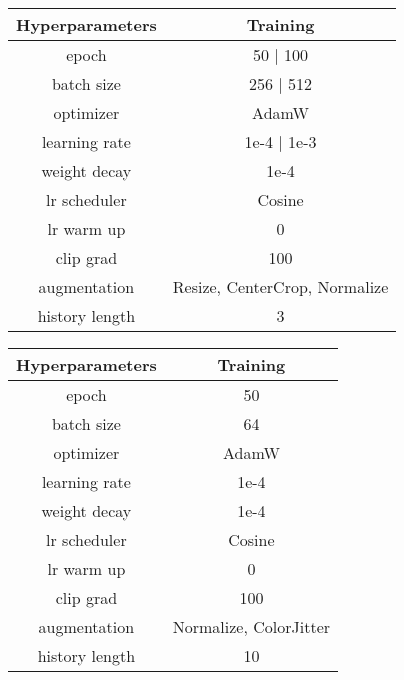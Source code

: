 \begin{table*}[ht]
\begin{minipage}[c]{0.48\textwidth}
\makeatletter{}
\centering
\caption{Training hyperparameters of all (full $|$ partial) fine-tuning baselines in CortexBench.}
\begin{tabular}{@{}cc@{}}
    \toprule
    Hyperparameters & Training \\
    \midrule
    epoch & 50 $|$ 100  \\
    batch size &  256 $|$ 512  \\
    optimizer & AdamW  \\
    learning rate & 1e-4 $|$ 1e-3  \\
    weight decay & 1e-4 \\
    lr scheduler & Cosine  \\
    lr warm up & 0 \\
    clip grad & 100 \\
    augmentation & Resize, CenterCrop, Normalize \\
    history length & 3 \\
    \bottomrule
\end{tabular}
\label{tab:appendix_cortex_para}
\end{minipage}
\begin{minipage}[c]{0.48\textwidth}
\makeatletter{}
\centering
  \caption{Training hyperparameters of all baselines in LIBERO.}
  \begin{tabular}{@{}cc@{}}
    \toprule
    Hyperparameters & Training  \\
    \midrule
    epoch & 50  \\
    batch size &  64  \\
    optimizer &  AdamW  \\
    learning rate & 1e-4  \\
    weight decay & 1e-4 \\
    lr scheduler & Cosine  \\
    lr warm up & 0 \\
    clip grad & 100 \\
    augmentation & Normalize, ColorJitter \\
    history length & 10 \\
    \bottomrule
  \end{tabular}
  \label{tab:appendix_libero_para}
\end{minipage}
\end{table*}




